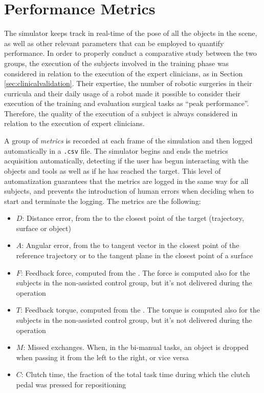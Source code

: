 \documentclass[../main.tex]{subfiles}
\begin{document}
\section{Performance Metrics}   
The simulator keeps track in real-time of the pose of all the objects in the scene, as well as other relevant parameters that can be employed to quantify performance. In order to properly conduct a comparative study between the two groups, the execution of the subjects involved in the training phase was considered in relation to the execution of the expert clinicians, as in Section \ref{sec:clinicalvalidation}. Their expertise, the number of robotic surgeries in their curricula and their daily usage of a \davinci robot made it possible to consider their execution of the training and evaluation surgical tasks as ``peak performance''. Therefore, the quality of the execution of a subject is always considered in relation to the execution of expert clinicians.

A group of \textit{metrics} is recorded at each frame of the simulation and then logged automatically in a \texttt{.csv} file. The simulator begins and ends the metrics acquisition automatically, detecting if the user has begun interacting with the objects and tools as well as if he has reached the target. This level of automatization guarantees that the metrics are logged in the same way for all subjects, and prevents the introduction of human errors when deciding when to start and terminate the logging. The metrics are the following:
\begin{itemize}
    \item $D$: Distance error, from the \ee to the closest point of the target (trajectory, surface or object)
    \item $A$: Angular error, from the \ee to tangent vector in the closest point of the reference trajectory or to the tangent plane in the closest point of a surface
    \item $F$: Feedback force, computed from the \vf. The force is computed also for the subjects in the non-assisted control group, but it's not delivered during the operation
    \item $T$: Feedback torque, computed from the \vf. The torque is computed also for the subjects in the non-assisted control group, but it's not delivered during the operation
    \item $M$: Missed exchanges. When, in the bi-manual tasks, an object is dropped when passing it from the left \psm to the right, or vice versa
    \item $C$: Clutch time, the fraction of the total task time during which the clutch pedal was pressed for repositioning
\end{itemize}  
\end{document}
